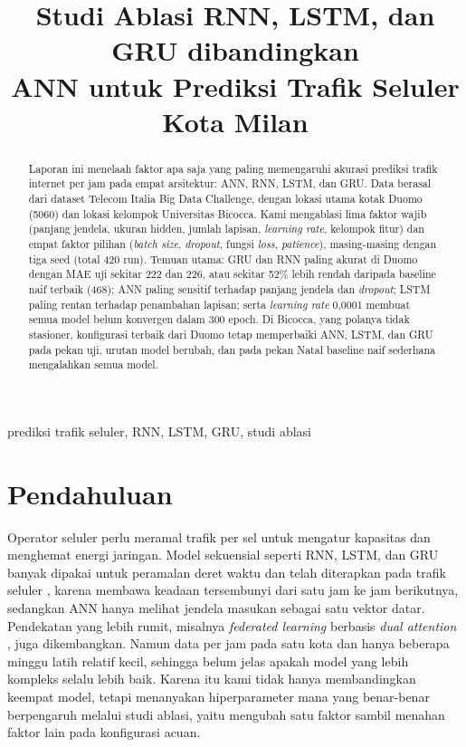 \documentclass[conference,a4paper]{IEEEtran}
\begin{document}
\title{Studi Ablasi RNN, LSTM, dan GRU dibandingkan\\ANN untuk Prediksi Trafik Seluler Kota Milan}

\author{
}

\maketitle

\begin{abstract}
Laporan ini menelaah faktor apa saja yang paling memengaruhi akurasi prediksi trafik internet per jam pada empat arsitektur: ANN, RNN, LSTM, dan GRU. Data berasal dari dataset Telecom Italia Big Data Challenge, dengan lokasi utama kotak Duomo (5060) dan lokasi kelompok Universitas Bicocca. Kami mengablasi lima faktor wajib (panjang jendela, ukuran hidden, jumlah lapisan, \emph{learning rate}, kelompok fitur) dan empat faktor pilihan (\emph{batch size}, \emph{dropout}, fungsi \emph{loss}, \emph{patience}), masing-masing dengan tiga seed (total 420 run). Temuan utama: GRU dan RNN paling akurat di Duomo dengan MAE uji sekitar 222 dan 226, atau sekitar 52\% lebih rendah daripada baseline naif terbaik (468); ANN paling sensitif terhadap panjang jendela dan \emph{dropout}; LSTM paling rentan terhadap penambahan lapisan; serta \emph{learning rate} 0,0001 membuat semua model belum konvergen dalam 300 epoch. Di Bicocca, yang polanya tidak stasioner, konfigurasi terbaik dari Duomo tetap memperbaiki ANN, LSTM, dan GRU pada pekan uji, urutan model berubah, dan pada pekan Natal baseline naif sederhana mengalahkan semua model.
\end{abstract}

\begin{IEEEkeywords}
prediksi trafik seluler, RNN, LSTM, GRU, studi ablasi
\end{IEEEkeywords}

\section{Pendahuluan}
Operator seluler perlu meramal trafik per sel untuk mengatur kapasitas dan menghemat energi jaringan. Model sekuensial seperti RNN, LSTM, dan GRU banyak dipakai untuk peramalan deret waktu \cite{lim2021} dan telah diterapkan pada trafik seluler \cite{jaffry2020,santos2022}, karena membawa keadaan tersembunyi dari satu jam ke jam berikutnya, sedangkan ANN hanya melihat jendela masukan sebagai satu vektor datar. Pendekatan yang lebih rumit, misalnya \emph{federated learning} berbasis \emph{dual attention} \cite{zhang2021}, juga dikembangkan. Namun data per jam pada satu kota dan hanya beberapa minggu latih relatif kecil, sehingga belum jelas apakah model yang lebih kompleks selalu lebih baik. Karena itu kami tidak hanya membandingkan keempat model, tetapi menanyakan hiperparameter mana yang benar-benar berpengaruh melalui studi ablasi, yaitu mengubah satu faktor sambil menahan faktor lain pada konfigurasi acuan.
\end{document}
